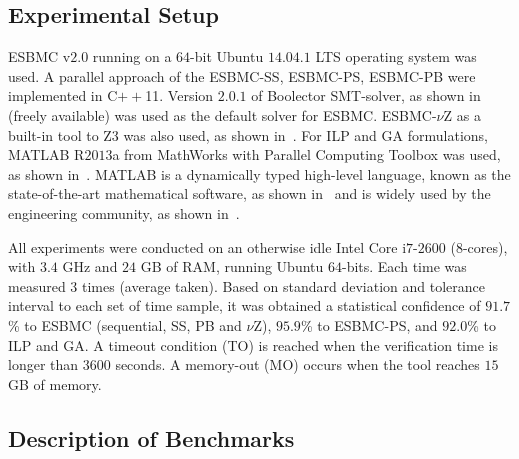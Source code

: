 \documentclass{doublecol-new}
\theoremstyle{TH}{
\newtheorem{lemma}{Lemma}
\newtheorem{theorem}[lemma]{Theorem}
\newtheorem{corrolary}[lemma]{Corrolary}
\newtheorem{conjecture}[lemma]{Conjecture}
\newtheorem{proposition}[lemma]{Proposition}
\newtheorem{claim}[lemma]{Claim}
\newtheorem{stheorem}[lemma]{Wrong Theorem}
\newtheorem{algorithm}{Algorithm}
}
\theoremstyle{THrm}{
\newtheorem{definition}{Definition}[section]
\newtheorem{question}{Question}[section]
\newtheorem{remark}{Remark}
\newtheorem{scheme}{Scheme}
}
\theoremstyle{THhit}{
\newtheorem{case}{Case}[section]
}
\begin{document}
\subsection{Experimental Setup}
\label{Experimental-Setup}

ESBMC v$2$.$0$ running on a $64$-bit Ubuntu $14$.$04$.$1$ LTS operating system was used. A parallel approach of the ESBMC-SS, ESBMC-PS, ESBMC-PB were implemented in C$++$11. Version $2$.$0$.$1$ of Boolector SMT-solver, as shown in~\cite{Brummayer2009} (freely available) was used as the default solver for ESBMC. ESBMC-$\nu$Z as a built-in tool to Z3 was also used, as shown in~\cite{Bjorner2014}.  For ILP and GA formulations, MATLAB R$2013$a from MathWorks with Parallel Computing Toolbox was used, as shown in~\cite{TheMathWorks2013}. MATLAB is a dynamically typed high-level language, known as the state-of-the-art mathematical software, as shown in~\cite{Tranquillo2011} and is widely used by the engineering community, as shown in~\cite{Hong2010}.

All experiments were conducted on an otherwise idle Intel Core i$7$-$2600$ ($8$-cores), with $3$.$4$ GHz and $24$ GB of RAM, running Ubuntu $64$-bits. Each time was measured $3$ times (average taken). Based on standard deviation and tolerance interval to each set of time sample, it was obtained a statistical confidence of $91.7$\% to ESBMC (sequential, SS, PB and $\nu$Z), $95.9$\% to ESBMC-PS, and $92.0$\% to ILP and GA. A timeout condition (TO) is reached when the verification time is longer than $3600$ seconds. A memory-out (MO) occurs when the tool reaches $15$ GB of memory. 

\subsection{Description of Benchmarks}
\label{Benchmarks-Description}
\end{document}
